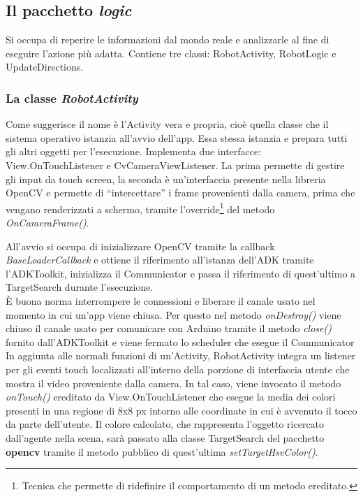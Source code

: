 \subsection {Il pacchetto \textit{logic}}
Si occupa di reperire le informazioni dal mondo reale e analizzarle al fine di
eseguire l'azione più adatta.
Contiene tre classi: RobotActivity, RobotLogic e UpdateDirections.

\subsubsection{La classe \emph{RobotActivity}}
Come suggerisce il nome è l'Activity vera e propria, cioè quella classe che il 
sistema operativo istanzia all'avvio dell'app. Essa stessa istanzia e prepara tutti gli 
altri oggetti per l'esecuzione. Implementa due interfacce: View.OnTouchListener 
e CvCameraViewListener. 
La prima permette di gestire gli input da touch screen,
la seconda è un'interfaccia presente nella libreria OpenCV e permette di ``intercettare''
i frame provenienti dalla camera, prima che vengano renderizzati a schermo, tramite 
l'override\footnote{Tecnica che permette di ridefinire il comportamento di un metodo 
ereditato.} del metodo \textit{OnCameraFrame()}.

All'avvio si occupa di inizializzare OpenCV tramite la 
callback \textit{BaseLoaderCallback} e ottiene il riferimento all'istanza dell'ADK
tramite l'ADKToolkit, inizializza il Communicator e passa il riferimento di quest'ultimo
a TargetSearch durante l'esecuzione.
\\È buona norma interrompere le connessioni e liberare il canale usato 
nel momento in cui un'app viene chiusa. Per questo nel metodo \emph{onDestroy()} 
viene chiuso il canale usato per comunicare con Arduino tramite il metodo \emph{close()}
fornito dall'ADKToolkit e viene fermato lo scheduler che esegue il Communicator\\
In aggiunta alle normali funzioni di un'Activity, RobotActivity integra un 
listener per gli eventi touch localizzati all'interno della porzione di 
interfaccia utente che mostra il video proveniente dalla camera. In tal caso, 
viene invocato il metodo \emph{onTouch()} ereditato da View.OnTouchListener 
che esegue la media dei colori presenti in una regione di 8x8 px intorno alle coordinate
in cui è avvenuto il tocco da parte dell'utente. Il colore calcolato, 
che rappresenta l'oggetto ricercato dall'agente nella scena, sarà passato 
alla classe TargetSearch del pacchetto \textbf{opencv} tramite il metodo pubblico 
di quest'ultima \emph{setTargetHsvColor()}.

